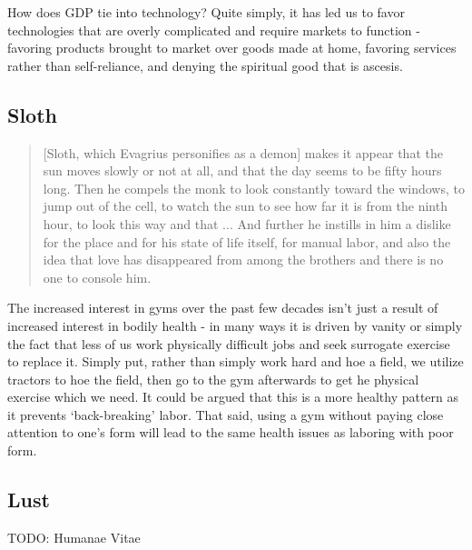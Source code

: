 \documentclass[letterpaper]{article}
\begin{document}
How does GDP tie into technology? Quite simply, it has led us to favor technologies that are overly complicated and require markets to function - favoring products brought to market over goods made at home, favoring services rather than self-reliance, and denying the spiritual good that is ascesis.


\subsection{Sloth}

\begin{quote}
  [Sloth, which Evagrius personifies as a demon] makes it appear that the sun moves slowly or not at all, and that the day seems to be fifty hours long. Then he compels the monk to look constantly toward the windows, to jump out of the cell, to watch the sun to see how far it is from the ninth hour, to look this way and that ... And further he instills in him a dislike for the place and for his state of life itself, for manual labor, and also the idea that love has disappeared from among the brothers and there is no one to console him.
\end{quote}

The increased interest in gyms over the past few decades isn't just a result of increased interest in bodily health - in many ways it is driven by vanity or simply the fact that less of us work physically difficult jobs and seek surrogate exercise to replace it. Simply put, rather than simply work hard and hoe a field, we utilize tractors to hoe the field, then go to the gym afterwards to get he physical exercise which we need. It could be argued that this is a more healthy pattern as it prevents `back-breaking' labor. That said, using a gym without paying close attention to one's form will lead to the same health issues as laboring with poor form.

\hfill

\hfill

\hfill

\hfill

\hfill

\hfill

\subsection{Lust}

TODO: Humanae Vitae
\end{document}
